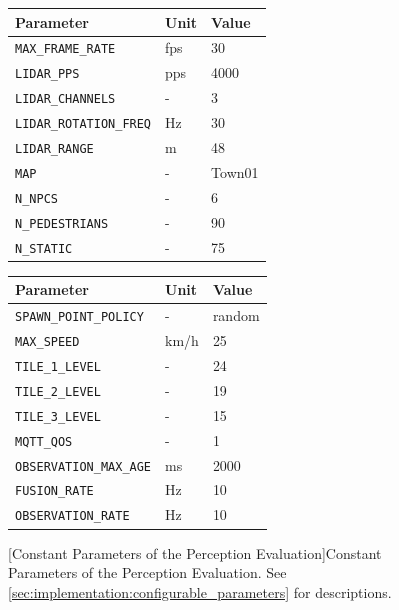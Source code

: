 \begin{figure}
	\begin{minipage}{0.5\textwidth}
		\begin{tabular}{|p{4.1cm}|p{1.1cm}|p{1.4cm}|}
			\hline 
			\textbf{Parameter} & \textbf{Unit} & \textbf{Value} \\ 
			\hline 
			\texttt{MAX\_FRAME\_RATE} & fps & 30 \\ 
			\hline 
			\texttt{LIDAR\_PPS} & pps & 4000 \\ 
			\hline 
			\texttt{LIDAR\_CHANNELS} & - & 3 \\ 
			\hline 
			\texttt{LIDAR\_ROTATION\_FREQ} & Hz & 30 \\ 
			\hline 
			\texttt{LIDAR\_RANGE} & m & 48 \\ 
			\hline 
			\texttt{MAP} & - & Town01 \\ 
			\hline 
			\texttt{N\_NPCS} & - & 6 \\ 
			\hline 
			\texttt{N\_PEDESTRIANS} & - & 90 \\ 
			\hline 
			\texttt{N\_STATIC} & - & 75 \\ 
			\hline 
		\end{tabular}
	\end{minipage}
	\begin{minipage}{0.5\textwidth}
		\begin{tabular}{|p{4.1cm}|p{1.1cm}|p{1.4cm}|}
			\hline 
			\textbf{Parameter} & \textbf{Unit} & \textbf{Value} \\ 
			\hline 
			\texttt{SPAWN\_POINT\_POLICY} & - & random \\ 
			\hline 
			\texttt{MAX\_SPEED} & km/h & 25 \\ 
			\hline 
			\texttt{TILE\_1\_LEVEL} & - & 24 \\ 
			\hline 
			\texttt{TILE\_2\_LEVEL} & - & 19 \\ 
			\hline 
			\texttt{TILE\_3\_LEVEL} & - & 15 \\ 
			\hline 
			\texttt{MQTT\_QOS} & - & 1 \\ 
			\hline 
			\texttt{OBSERVATION\_MAX\_AGE} & ms & 2000 \\ 
			\hline 
			\texttt{FUSION\_RATE} & Hz & 10 \\ 
			\hline 
			\texttt{OBSERVATION\_RATE} & Hz & 10 \\ 
			\hline
		\end{tabular} 
	\end{minipage}
	[Constant Parameters of the Perception Evaluation]{Constant Parameters of the Perception Evaluation. See \cref{sec:implementation:configurable_parameters} for descriptions.}
	\label{tab:perception_evaluation:constant_parameters}
\end{figure}

